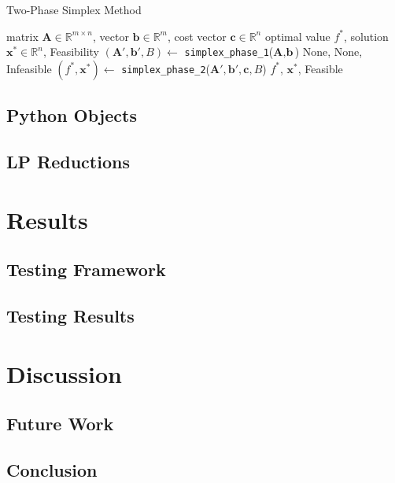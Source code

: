 \documentclass[conference]{IEEEtran}
\begin{document}
\begin{algorithm}
    \caption{Two-Phase Simplex Method}
    \label{alg:two_phase_simplex}
    \begin{algorithmic}[1]
    \Require matrix $\textbf{A} \in \mathbb{R}^{m \times n}$, vector $\textbf{b} \in \mathbb{R}^{m}$, cost vector $\textbf{c} \in \mathbb{R}^{n}$
    \Ensure optimal value $f^*$, solution $\textbf{x}^* \in \mathbb{R}^n$, Feasibility
    \State $(\textbf{A}', \textbf{b}', B) \gets$ \texttt{simplex\_phase\_1}($\textbf{A}, \textbf{b}$)
        \State \Return None, None, Infeasible
    \EndIf
    \State $(f^*, \textbf{x}^*) \gets$ \texttt{simplex\_phase\_2}($\textbf{A}', \textbf{b}', \textbf{c}, B$)
    \State \Return $f^*$, $\textbf{x}^*$, Feasible
    \end{algorithmic}
\end{algorithm}
    
\subsection{Python Objects}
\label{Objects}

\subsection{LP Reductions}
\label{Reductions}

\section{Results}
\subsection{Testing Framework}

\subsection{Testing Results}


\section{Discussion}
\subsection{Future Work}
\label{future_work}

\subsection{Conclusion}
\end{document}

